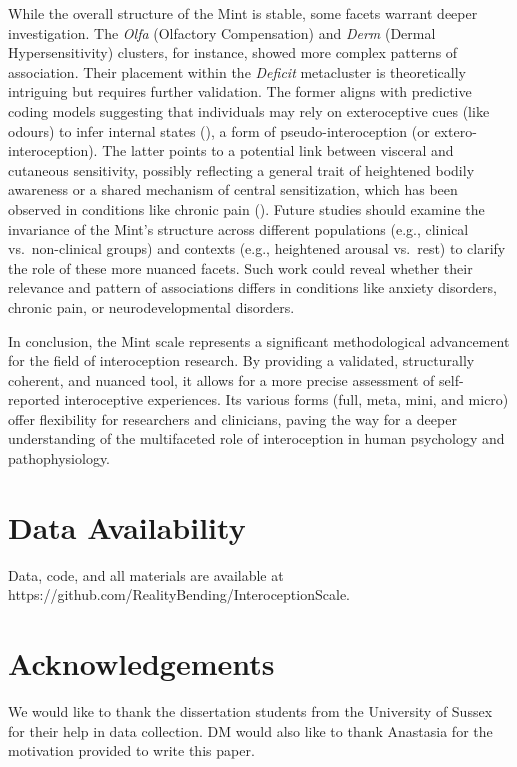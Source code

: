 \documentclass[
  jou,
  floatsintext,
  longtable,
  nolmodern,
  notxfonts,
  notimes,
  colorlinks=true,linkcolor=blue,citecolor=blue,urlcolor=blue]{apa7}
\begin{document}
While the overall structure of the Mint is stable, some facets warrant
deeper investigation. The \emph{Olfa} (Olfactory Compensation) and
\emph{Derm} (Dermal Hypersensitivity) clusters, for instance, showed
more complex patterns of association. Their placement within the
\emph{Deficit} metacluster is theoretically intriguing but requires
further validation. The former aligns with predictive coding models
suggesting that individuals may rely on exteroceptive cues (like odours)
to infer internal states (), a form of pseudo-interoception (or
extero-interoception). The latter points to a potential link between
visceral and cutaneous sensitivity, possibly reflecting a general trait
of heightened bodily awareness or a shared mechanism of central
sensitization, which has been observed in conditions like chronic pain
(). Future
studies should examine the invariance of the Mint's structure across
different populations (e.g., clinical vs.~non-clinical groups) and
contexts (e.g., heightened arousal vs.~rest) to clarify the role of
these more nuanced facets. Such work could reveal whether their
relevance and pattern of associations differs in conditions like anxiety
disorders, chronic pain, or neurodevelopmental disorders.

In conclusion, the Mint scale represents a significant methodological
advancement for the field of interoception research. By providing a
validated, structurally coherent, and nuanced tool, it allows for a more
precise assessment of self-reported interoceptive experiences. Its
various forms (full, meta, mini, and micro) offer flexibility for
researchers and clinicians, paving the way for a deeper understanding of
the multifaceted role of interoception in human psychology and
pathophysiology.

\section{Data Availability}\label{data-availability}

Data, code, and all materials are available at
https://github.com/RealityBending/InteroceptionScale.

\section{Acknowledgements}\label{acknowledgements}

We would like to thank the dissertation students from the University of
Sussex for their help in data collection. DM would also like to thank
Anastasia for the motivation provided to write this paper.
\end{document}
